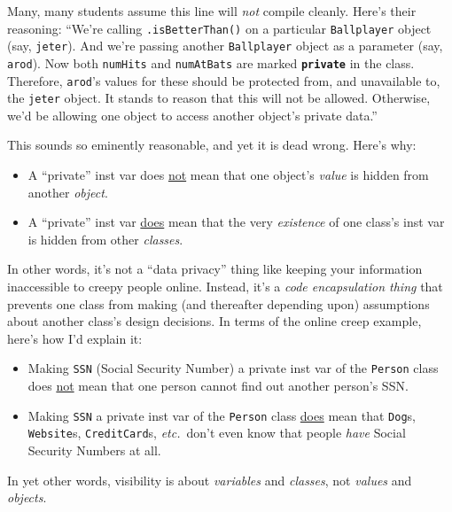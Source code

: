 Many, many students assume this line will \textit{not} compile cleanly. Here's
their reasoning: ``We're calling \texttt{.isBetterThan()} on a particular
\texttt{Ballplayer} object (say, \texttt{jeter}). And we're passing another
\texttt{Ballplayer} object as a parameter (say, \texttt{arod}). Now both
\texttt{numHits} and \texttt{numAtBats} are marked \textbf{\texttt{private}}
in the class. Therefore, \texttt{arod}'s values for these should be protected
from, and unavailable to, the \texttt{jeter} object. It stands to reason that
this will not be allowed. Otherwise, we'd be allowing one object to access
another object's private data.''

This sounds so eminently reasonable, and yet it is dead wrong. Here's why:

\begin{itemize}
\itemsep.1em
\item A ``private'' inst var does \underline{not} mean that one object's
\textit{value} is hidden from another \textit{object}.
\item A ``private'' inst var \underline{does} mean that the very
\textit{existence} of one class's inst var is hidden from other
\textit{classes}.
\end{itemize}

In other words, it's not a ``data privacy'' thing like keeping your information
inaccessible to creepy people online. Instead, it's a \textit{code
encapsulation thing} that prevents one class from making (and thereafter
depending upon) assumptions about another class's design decisions. In terms
of the online creep example, here's how I'd explain it:

\begin{itemize}
\itemsep.1em
\item Making \texttt{SSN} (Social Security Number) a private inst var of the
\texttt{Person} class does \underline{not} mean that one person cannot find
out another person's SSN.
\item Making \texttt{SSN} a private inst var of the \texttt{Person} class
\underline{does} mean that \texttt{Dog}s, \texttt{Website}s,
\texttt{CreditCard}s, \textit{etc.}~don't even know that people \textit{have}
Social Security Numbers at all.
\end{itemize}

In yet other words, visibility is about \textit{variables} and
\textit{classes}, not \textit{values} and \textit{objects}.


